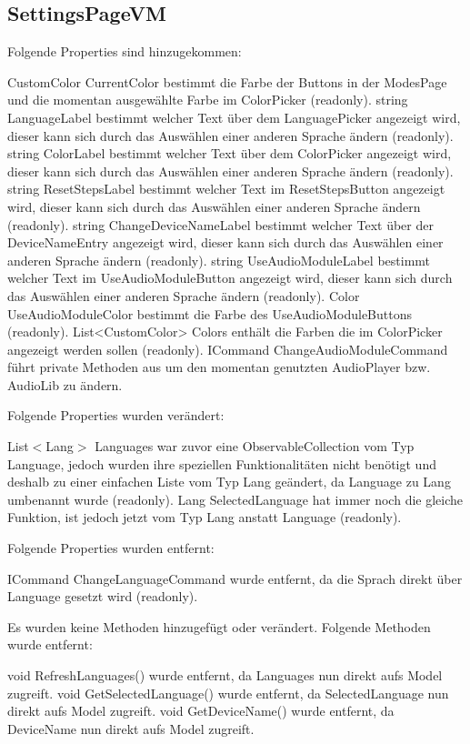 \documentclass[../implementierung.tex]{subfiles}
\begin{document}
		\subsection{SettingsPageVM}
			Folgende Properties sind hinzugekommen:
			\begin{itemize}
				\add CustomColor CurrentColor bestimmt die Farbe der Buttons in der ModesPage und die momentan ausgewählte Farbe im ColorPicker (readonly).
				\add string LanguageLabel bestimmt welcher Text über dem LanguagePicker angezeigt wird, dieser kann sich durch das Auswählen einer anderen Sprache ändern (readonly).
				\add string ColorLabel bestimmt welcher Text über dem ColorPicker angezeigt wird, dieser kann sich durch das Auswählen einer anderen Sprache ändern (readonly).
				\add string ResetStepsLabel bestimmt welcher Text im ResetStepsButton angezeigt wird, dieser kann sich durch das Auswählen einer anderen Sprache ändern (readonly).
				\add string ChangeDeviceNameLabel bestimmt welcher Text über der DeviceNameEntry angezeigt wird, dieser kann sich durch das Auswählen einer anderen Sprache ändern (readonly).
				\add string UseAudioModuleLabel bestimmt welcher Text im UseAudioModuleButton angezeigt wird, dieser kann sich durch das Auswählen einer anderen Sprache ändern (readonly).
				\add Color UseAudioModuleColor bestimmt die Farbe des UseAudioModuleButtons (readonly).
				\add List<CustomColor> Colors enthält die Farben die im ColorPicker angezeigt werden sollen (readonly).
				\add ICommand ChangeAudioModuleCommand führt private Methoden aus um den momentan genutzten AudioPlayer bzw. AudioLib zu ändern.
			\end{itemize}
			Folgende Properties wurden verändert:
			\begin{itemize}
				\changed List$<$Lang$>$ Languages war zuvor eine ObservableCollection vom Typ Language, jedoch wurden ihre speziellen Funktionalitäten nicht benötigt und deshalb zu einer einfachen Liste vom Typ Lang geändert, da Language zu Lang umbenannt wurde (readonly).
				\changed Lang SelectedLanguage hat immer noch die gleiche Funktion, ist jedoch jetzt vom Typ Lang anstatt Language (readonly).
			\end{itemize}	
			Folgende Properties wurden entfernt:
			\begin{itemize}
				\changed ICommand ChangeLanguageCommand wurde entfernt, da die Sprach direkt über Language gesetzt wird (readonly).
			\end{itemize}
			Es wurden keine Methoden hinzugefügt oder verändert. \newline
			Folgende Methoden wurde entfernt:
			\begin{itemize}
				\remove void RefreshLanguages() wurde entfernt, da Languages nun direkt aufs Model zugreift.	
				\remove void GetSelectedLanguage() wurde entfernt, da SelectedLanguage nun direkt aufs Model zugreift.
				\remove void GetDeviceName() wurde entfernt, da DeviceName nun direkt aufs Model zugreift.
			\end{itemize}
\end{document}
